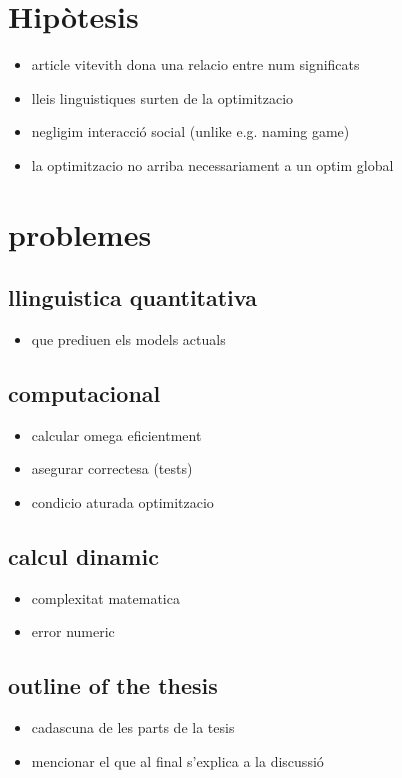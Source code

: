\section{Hipòtesis}
\begin{itemize}
\item article vitevith dona una relacio entre num significats
\item lleis linguistiques surten de la optimitzacio
\item negligim interacció social (unlike e.g. naming game)
\item la optimitzacio no arriba necessariament a un optim global
\end{itemize}
\section{problemes}
\subsection{llinguistica quantitativa}
\begin{itemize}
\item que prediuen els models actuals
\end{itemize}
\subsection{computacional}
\begin{itemize}
\item calcular omega eficientment
\item asegurar correctesa (tests)
\item condicio aturada optimitzacio
\end{itemize}
\subsection{calcul dinamic}
\begin{itemize}
\item complexitat matematica
\item error numeric
\end{itemize}
\subsection{outline of the thesis}
\begin{itemize}
\item cadascuna de les parts de la tesis
\item mencionar el que al final s'explica a la discussió
\end{itemize}

